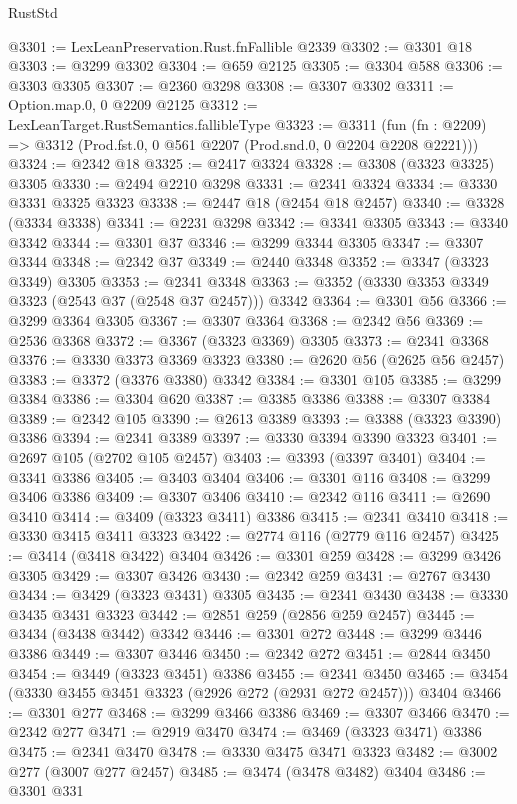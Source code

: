 \begin{lexlean}{RustStd}
\begin{coremodule}
@3301 := LexLeanPreservation.Rust.fnFallible @2339
@3302 := @3301 @18
@3303 := @3299 @3302
@3304 := @659 @2125
@3305 := @3304 @588
@3306 := @3303 @3305
@3307 := @2360 @3298
@3308 := @3307 @3302
@3311 := Option.map.{0, 0} @2209 @2125
@3312 := LexLeanTarget.RustSemantics.fallibleType
@3323 := @3311
    (fun (fn : @2209) => @3312 (Prod.fst.{0, 0} @561 @2207 (Prod.snd.{0, 0} @2204 @2208 @2221)))
@3324 := @2342 @18
@3325 := @2417 @3324
@3328 := @3308 (@3323 @3325) @3305
@3330 := @2494 @2210 @3298
@3331 := @2341 @3324
@3334 := @3330 @3331 @3325 @3323
@3338 := @2447 @18 (@2454 @18 @2457)
@3340 := @3328 (@3334 @3338)
@3341 := @2231 @3298
@3342 := @3341 @3305
@3343 := @3340 @3342
@3344 := @3301 @37
@3346 := @3299 @3344 @3305
@3347 := @3307 @3344
@3348 := @2342 @37
@3349 := @2440 @3348
@3352 := @3347 (@3323 @3349) @3305
@3353 := @2341 @3348
@3363 := @3352 (@3330 @3353 @3349 @3323 (@2543 @37 (@2548 @37 @2457))) @3342
@3364 := @3301 @56
@3366 := @3299 @3364 @3305
@3367 := @3307 @3364
@3368 := @2342 @56
@3369 := @2536 @3368
@3372 := @3367 (@3323 @3369) @3305
@3373 := @2341 @3368
@3376 := @3330 @3373 @3369 @3323
@3380 := @2620 @56 (@2625 @56 @2457)
@3383 := @3372 (@3376 @3380) @3342
@3384 := @3301 @105
@3385 := @3299 @3384
@3386 := @3304 @620
@3387 := @3385 @3386
@3388 := @3307 @3384
@3389 := @2342 @105
@3390 := @2613 @3389
@3393 := @3388 (@3323 @3390) @3386
@3394 := @2341 @3389
@3397 := @3330 @3394 @3390 @3323
@3401 := @2697 @105 (@2702 @105 @2457)
@3403 := @3393 (@3397 @3401)
@3404 := @3341 @3386
@3405 := @3403 @3404
@3406 := @3301 @116
@3408 := @3299 @3406 @3386
@3409 := @3307 @3406
@3410 := @2342 @116
@3411 := @2690 @3410
@3414 := @3409 (@3323 @3411) @3386
@3415 := @2341 @3410
@3418 := @3330 @3415 @3411 @3323
@3422 := @2774 @116 (@2779 @116 @2457)
@3425 := @3414 (@3418 @3422) @3404
@3426 := @3301 @259
@3428 := @3299 @3426 @3305
@3429 := @3307 @3426
@3430 := @2342 @259
@3431 := @2767 @3430
@3434 := @3429 (@3323 @3431) @3305
@3435 := @2341 @3430
@3438 := @3330 @3435 @3431 @3323
@3442 := @2851 @259 (@2856 @259 @2457)
@3445 := @3434 (@3438 @3442) @3342
@3446 := @3301 @272
@3448 := @3299 @3446 @3386
@3449 := @3307 @3446
@3450 := @2342 @272
@3451 := @2844 @3450
@3454 := @3449 (@3323 @3451) @3386
@3455 := @2341 @3450
@3465 := @3454 (@3330 @3455 @3451 @3323 (@2926 @272 (@2931 @272 @2457))) @3404
@3466 := @3301 @277
@3468 := @3299 @3466 @3386
@3469 := @3307 @3466
@3470 := @2342 @277
@3471 := @2919 @3470
@3474 := @3469 (@3323 @3471) @3386
@3475 := @2341 @3470
@3478 := @3330 @3475 @3471 @3323
@3482 := @3002 @277 (@3007 @277 @2457)
@3485 := @3474 (@3478 @3482) @3404
@3486 := @3301 @331

\end{coremodule}
\end{lexlean}
